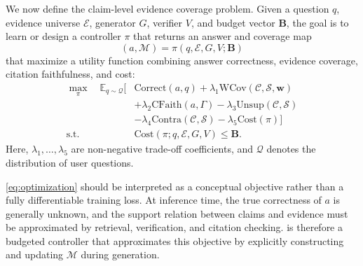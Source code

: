 We now define the claim-level evidence coverage problem. Given a question $q$, evidence universe $\mathcal{E}$, generator $G$, verifier $V$, and budget vector $\mathbf{B}$, the goal is to learn or design a controller $\pi$ that returns an answer and coverage map
\begin{equation}
    (a, \mathcal{M}) = \pi(q, \mathcal{E}, G, V; \mathbf{B})
\end{equation}
that maximize a utility function combining answer correctness, evidence coverage, citation faithfulness, and cost:
\begin{align}
    \max_{\pi} \quad
    \mathbb{E}_{q \sim \mathcal{Q}}
    \Big[
        &\mathrm{Correct}(a, q)
        + \lambda_1 \mathrm{WCov}(\mathcal{C}, \mathcal{S}, \mathbf{w}) \nonumber \\
        &+ \lambda_2 \mathrm{CFaith}(a, \Gamma)
        - \lambda_3 \mathrm{Unsup}(\mathcal{C}, \mathcal{S}) \nonumber \\
        &- \lambda_4 \mathrm{Contra}(\mathcal{C}, \mathcal{S})
        - \lambda_5 \mathrm{Cost}(\pi)
    \Big] \nonumber \\
    \text{s.t.} \quad
        &\mathrm{Cost}(\pi; q, \mathcal{E}, G, V) \leq \mathbf{B}.
    \label{eq:optimization}
\end{align}
Here, $\lambda_1,\ldots,\lambda_5$ are non-negative trade-off coefficients, and $\mathcal{Q}$ denotes the distribution of user questions.

\autoref{eq:optimization} should be interpreted as a conceptual objective rather than a fully differentiable training loss. At inference time, the true correctness of $a$ is generally unknown, and the support relation between claims and evidence must be approximated by retrieval, verification, and citation checking. \ragname is therefore a budgeted controller that approximates this objective by explicitly constructing and updating $\mathcal{M}$ during generation.

